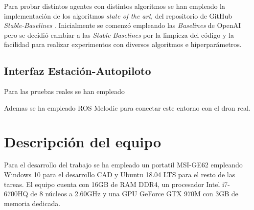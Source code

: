 Para probar distintos agentes con distintos algoritmos se han empleado la implementación de los algoritmos \textit{state of the art}, del repositorio de GitHub \textit{Stable-Baselines} \cite{stable-baselines}. Inicialmente se comenzó empleando las \textit{Baselines} de OpenAI \cite{OpenAIbaselines} pero se decidió cambiar a las \textit{Stable Baselines} por la limpieza del código y la facilidad para realizar experimentos con diversos algoritmos e hiperparámetros.






\subsection{Interfaz Estación-Autopiloto}

Para las pruebas reales se han empleado

Ademas se ha empleado ROS Melodic para conectar este entorno con el dron real.


\section{Descripción del equipo}
Para el desarrollo del trabajo se ha empleado un portatil MSI-GE62 empleando Windows 10 para el desarrollo CAD y Ubuntu 18.04 LTS para el resto de las tareas. El equipo cuenta con 16GB de RAM DDR4, un procesador Intel i7-6700HQ de 8 núcleos a 2.60GHz y una GPU GeForce GTX 970M con 3GB de memoria dedicada.

